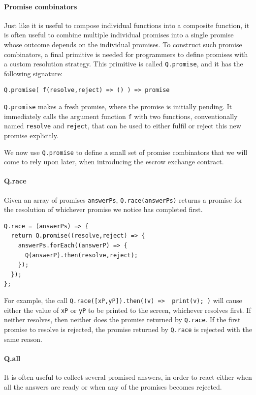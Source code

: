 \documentclass{llncs}
\begin{document}
\paragraph{Promise combinators}

Just like it is useful to compose individual functions into a composite function, it is often useful to combine multiple individual promises into a single promise whose outcome depends on the individual promises. To construct such promise combinators, a final primitive is needed for programmers to define promises with a custom resolution strategy. This primitive is called \texttt{Q.promise}, and it has the following signature:

\begin{verbatim}
Q.promise( f(resolve,reject) => () ) => promise
\end{verbatim}

\texttt{Q.promise} makes a fresh promise, where the promise is initially pending. It immediately calls the argument function \texttt{f} with two functions, conventionally named \texttt{resolve} and \texttt{reject}, that can be used to either fulfil or reject this new promise explicitly.

We now use \texttt{Q.promise} to define a small set of promise combinators that we will come to rely upon later, when introducing the escrow exchange contract.

\paragraph{Q.race} Given an array of promises \texttt{answerPs}, \texttt{Q.race(answerPs)} returns a promise for the resolution of whichever promise we notice has completed first.

\begin{verbatim}
Q.race = (answerPs) => {
  return Q.promise((resolve,reject) => {
    answerPs.forEach((answerP) => {
      Q(answerP).then(resolve,reject);
    });
  });
};
\end{verbatim}

For example, the call \texttt{Q.race([xP,yP]).then((v) => { print(v); })} will cause either the value of \texttt{xP} or \texttt{yP} to be printed to the screen, whichever resolves first. If neither resolves, then neither does the promise returned by \texttt{Q.race}. If the first promise to resolve is rejected, the promise returned by \texttt{Q.race} is rejected with the same reason.

\paragraph{Q.all} It is often useful to collect several promised answers, in order to react either when all the answers are ready or when any of the promises becomes rejected.
\end{document}
